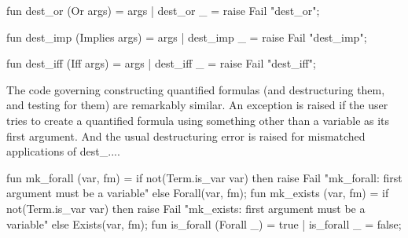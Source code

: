 fun dest_or (Or args) = args
  | dest_or _ = raise Fail "dest_or";

fun dest_imp (Implies args) = args
  | dest_imp _ = raise Fail "dest_imp";

fun dest_iff (Iff args) = args
  | dest_iff _ = raise Fail "dest_iff";
\eatline
{}\nwendcode{}\nwdocspar
\begin{node}
The code governing constructing quantified formulas (and destructuring
them, and testing for them) are remarkably similar. An exception is
raised if the user tries to create a quantified formula using
something other than a variable as its first argument. And the usual
destructuring error is raised for mismatched applications of {\Tt{}dest{\_}...\nwendquote}.
\end{node}

\nwenddocs{}\plusendmoddef\nwstartdeflinemarkup{}\nwenddeflinemarkup
fun mk_forall (var, fm) =
  if not(Term.is_var var)
  then raise Fail "mk_forall: first argument must be a variable"
  else Forall(var, fm);
fun mk_exists (var, fm) =
  if not(Term.is_var var)
  then raise Fail "mk_exists: first argument must be a variable"
  else Exists(var, fm);
\eatline
{}\nwendcode{}\nwdocspar
\nwenddocs{}\plusendmoddef\nwstartdeflinemarkup{}\nwenddeflinemarkup
fun is_forall (Forall _) = true
  | is_forall _ = false;

